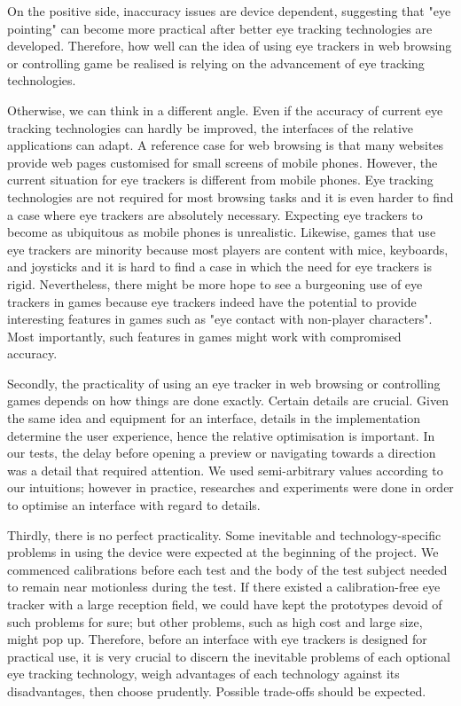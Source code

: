 \documentclass[english]{tktltiki}
\begin{document}
On the positive side, inaccuracy issues are device dependent, suggesting that "eye pointing" can become more practical after better eye tracking technologies are developed. Therefore, how well can the idea of using eye trackers in web browsing or controlling game be realised is relying on the advancement of eye tracking technologies. 

Otherwise, we can think in a different angle. Even if the accuracy of current eye tracking technologies can hardly be improved, the interfaces of the relative applications can adapt. A reference case for web browsing is that many websites provide web pages customised for small screens of mobile phones. However, the current situation for eye trackers is different from mobile phones. Eye tracking technologies are not required for most browsing tasks and it is even harder to find a case where eye trackers are absolutely necessary. Expecting eye trackers to become as ubiquitous as mobile phones is unrealistic. Likewise, games that use eye trackers are minority because most players are content with mice, keyboards, and joysticks and it is hard to find a case in which the need for eye trackers is rigid. Nevertheless, there might be more hope to see a burgeoning use of eye trackers in games because eye trackers indeed have the potential to provide interesting features in games such as "eye contact with non-player characters". Most importantly, such features in games might work with compromised accuracy.

Secondly, the practicality of using an eye tracker in web browsing or controlling games depends on how things are done exactly. Certain details are crucial. Given the same idea and equipment for an interface, details in the implementation determine the user experience, hence the relative optimisation is important. In our tests, the delay before opening a preview or navigating towards a direction was a detail that required attention. We used semi-arbitrary values according to our intuitions; however in practice, researches and experiments were done in order to optimise an interface with regard to details.

Thirdly, there is no perfect practicality. Some inevitable and technology-specific problems in using the device were expected  at the beginning of the project. We commenced calibrations before each test and the body of the test subject needed to remain near motionless during the test. If there existed a calibration-free eye tracker with a large reception field, we could have kept the prototypes devoid of such problems for sure; but other problems, such as high cost and large size, might pop up. Therefore, before an interface with eye trackers is designed for practical use, it is very crucial to discern the inevitable problems of each optional eye tracking technology, weigh advantages of each technology against its disadvantages, then choose prudently. Possible trade-offs should be expected.
\end{document}
